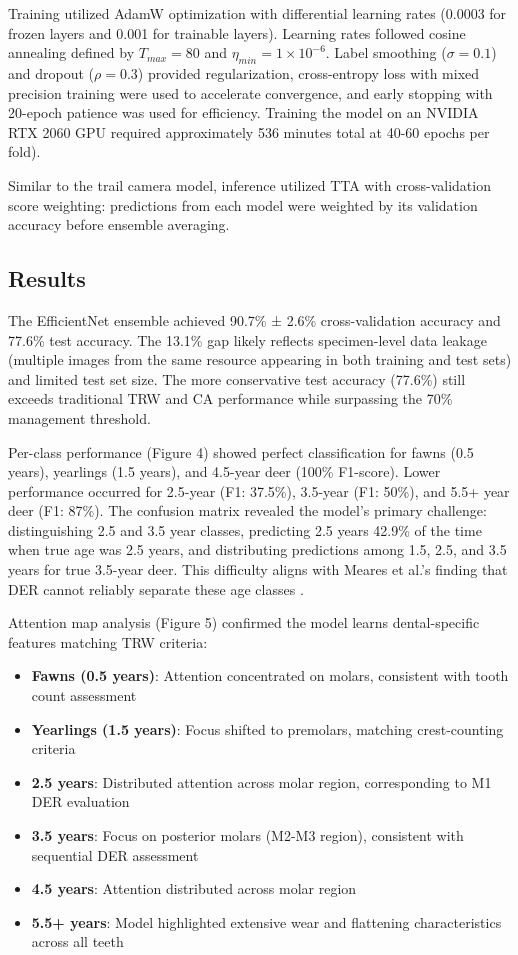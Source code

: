 \documentclass{iopjournal}
\begin{document}
Training utilized AdamW optimization with differential learning rates (0.0003 for frozen layers and 0.001 for trainable layers). Learning rates followed cosine annealing defined by $T_{max}=80$ and $\eta_{min}=1\times10^{-6}$. Label smoothing ($\sigma=0.1$) and dropout ($\rho=0.3$) provided regularization, cross-entropy loss with mixed precision training were used to accelerate convergence, and early stopping with 20-epoch patience was used for efficiency. Training the model on an NVIDIA RTX 2060 GPU required approximately 536 minutes total at 40-60 epochs per fold).

Similar to the trail camera model, inference utilized TTA with cross-validation score weighting: predictions from each model were weighted by its validation accuracy before ensemble averaging.

\subsection{Results}

The EfficientNet ensemble achieved 90.7\% ± 2.6\% cross-validation accuracy and 77.6\% test accuracy. The 13.1\% gap likely reflects specimen-level data leakage (multiple images from the same resource appearing in both training and test sets) and limited test set size. The more conservative test accuracy (77.6\%) still exceeds traditional TRW and CA performance while surpassing the 70\% management threshold.

Per-class performance (Figure 4) showed perfect classification for fawns (0.5 years), yearlings (1.5 years), and 4.5-year deer (100\% F1-score). Lower performance occurred for 2.5-year (F1: 37.5\%), 3.5-year (F1: 50\%), and 5.5+ year deer (F1: 87\%). The confusion matrix revealed the model's primary challenge: distinguishing 2.5 and 3.5 year classes, predicting 2.5 years 42.9\% of the time when true age was 2.5 years, and distributing predictions among 1.5, 2.5, and 3.5 years for true 3.5-year deer. This difficulty aligns with Meares et al.'s finding that DER cannot reliably separate these age classes \cite{meares2006quantitative}.

Attention map analysis (Figure 5) confirmed the model learns dental-specific features matching TRW criteria:
\begin{itemize}
	\item \textbf{Fawns (0.5 years)}: Attention concentrated on molars, consistent with tooth count assessment
	\item \textbf{Yearlings (1.5 years)}: Focus shifted to premolars, matching crest-counting criteria  
 	\item \textbf{2.5 years}: Distributed attention across molar region, corresponding to M1 DER evaluation
	\item \textbf{3.5 years}: Focus on posterior molars (M2-M3 region), consistent with sequential DER assessment
	\item \textbf{4.5 years}: Attention distributed across molar region
	\item \textbf{5.5+ years}: Model highlighted extensive wear and flattening characteristics across all teeth
\end{itemize}
\end{document}
